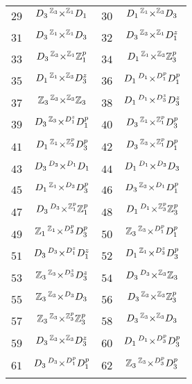 \documentclass[11pt]{article}
\newcommand{\amal}[5]{#1\prescript{#2}{}{\underset{#3}{\times}}^{#4}#5}
\begin{document}
\begin{table}
\begin{tabularx}{.6\textwidth}{@{}|c|C||c|C|@{}}
      $29$ & $\amal{D_3}{\mathbb{Z}_3}{}{\mathbb{Z}_1}{D_1}$ & $30$ & $\amal{D_1}{\mathbb{Z}_1}{}{\mathbb{Z}_3}{D_3}$ \\
      $31$ & $\amal{D_3}{\mathbb{Z}_1}{}{\mathbb{Z}_1}{D_3}$ & $32$ & $\amal{D_3}{\mathbb{Z}_3}{}{\mathbb{Z}_1}{D_1^z}$ \\
      $33$ & $\amal{D_3}{\mathbb{Z}_3}{}{\mathbb{Z}_1}{\mathbb{Z}_1^p}$ & $34$ & $\amal{D_1}{\mathbb{Z}_1}{}{\mathbb{Z}_3}{\mathbb{Z}_3^p}$ \\
      $35$ & $\amal{D_1}{\mathbb{Z}_1}{}{\mathbb{Z}_3}{D_3^z}$ & $36$ & $\amal{D_1}{D_1}{}{D_1^p}{D_1^p}$ \\
      $37$ & $\amal{\mathbb{Z}_3}{\mathbb{Z}_3}{}{\mathbb{Z}_3}{\mathbb{Z}_3}$ & $38$ & $\amal{D_1}{D_1}{}{D_3^z}{D_3^z}$ \\
      $39$ & $\amal{D_3}{\mathbb{Z}_3}{}{D_1^z}{D_1^p}$ & $40$ & $\amal{D_3}{\mathbb{Z}_1}{}{\mathbb{Z}_1^p}{D_3^p}$ \\
      $41$ & $\amal{D_1}{\mathbb{Z}_1}{}{\mathbb{Z}_3^p}{D_3^p}$ & $42$ & $\amal{D_3}{\mathbb{Z}_3}{}{\mathbb{Z}_1^p}{D_1^p}$ \\
      $43$ & $\amal{D_3}{D_3}{}{D_1}{D_1}$ & $44$ & $\amal{D_1}{D_1}{}{D_3}{D_3}$ \\
      $45$ & $\amal{D_1}{\mathbb{Z}_1}{}{D_3}{D_3^p}$ & $46$ & $\amal{D_3}{\mathbb{Z}_3}{}{D_1}{D_1^p}$ \\
      $47$ & $\amal{D_3}{D_3}{}{\mathbb{Z}_1^p}{\mathbb{Z}_1^p}$ & $48$ & $\amal{D_1}{D_1}{}{\mathbb{Z}_3^p}{\mathbb{Z}_3^p}$ \\
      $49$ & $\amal{\mathbb{Z}_1}{\mathbb{Z}_1}{}{D_3^p}{D_3^p}$ & $50$ & $\amal{\mathbb{Z}_3}{\mathbb{Z}_3}{}{D_1^p}{D_1^p}$ \\
      $51$ & $\amal{D_3}{D_3}{}{D_1^z}{D_1^z}$ & $52$ & $\amal{D_1}{\mathbb{Z}_1}{}{D_3^z}{D_3^p}$ \\
      $53$ & $\amal{\mathbb{Z}_3}{\mathbb{Z}_3}{}{D_3^z}{D_3^z}$ & $54$ & $\amal{D_3}{D_3}{}{\mathbb{Z}_3}{\mathbb{Z}_3}$ \\
      $55$ & $\amal{\mathbb{Z}_3}{\mathbb{Z}_3}{}{D_3}{D_3}$ & $56$ & $\amal{D_3}{\mathbb{Z}_3}{}{\mathbb{Z}_3}{\mathbb{Z}_3^p}$ \\
      $57$ & $\amal{\mathbb{Z}_3}{\mathbb{Z}_3}{}{\mathbb{Z}_3^p}{\mathbb{Z}_3^p}$ & $58$ & $\amal{D_3}{\mathbb{Z}_3}{}{\mathbb{Z}_3}{D_3}$ \\
      $59$ & $\amal{D_3}{\mathbb{Z}_3}{}{\mathbb{Z}_3}{D_3^z}$ & $60$ & $\amal{D_1}{D_1}{}{D_3^p}{D_3^p}$ \\
      $61$ & $\amal{D_3}{D_3}{}{D_1^p}{D_1^p}$ & $62$ & $\amal{\mathbb{Z}_3}{\mathbb{Z}_3}{}{D_3^p}{D_3^p}$ \\

\end{tabularx}
\end{table}
\end{document}
